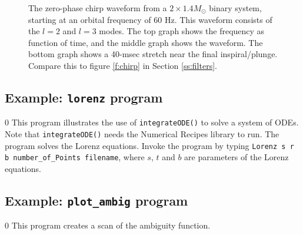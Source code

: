 

\begin{figure}
\begin{center}
\caption{ \label{f:tmchirp}
The zero-phase chirp waveform from a $2 \times 1.4 M_\odot$ binary system,
starting at an orbital frequency of 60 Hz.  This waveform consists of the 
$l=2$ and $l=3$ modes. The top graph shows the frequency
as function of time, and the middle graph
shows the waveform.  The bottom graph shows a 40-msec stretch near the final
inspiral/plunge. Compare this to figure \ref{f:chirp} in Section
\ref{ss:filters}.}
\end{center}
\end{figure}
\clearpage
\subsection{Example: {\tt lorenz} program}
\setcounter{equation}0
This program illustrates the use of {\tt integrateODE()}  to solve a system of
ODEs. Note that {\tt integrateODE()} needs the Numerical Recipes library to
run. The program solves the Lorenz equations. Invoke the program
by typing  {\tt Lorenz s r b number\_of\_Points filename}, where
$s$, $t$ and $b$ are parameters of the Lorenz equations.

\clearpage
\subsection{Example: {\tt plot\_ambig} program}
\setcounter{equation}0
This program creates a scan of the ambiguity function.

